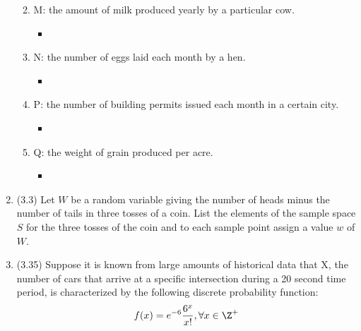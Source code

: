 \documentclass[basic, header]{nosvagor-notes}
\begin{document}
\begin{enumerate}[itemsep=7em]
\begin{enumerate}[label={}, leftmargin=0em]
\begin{itemize}
        \end{itemize}
      \item M: the amount of milk produced yearly by a particular cow.
        \begin{itemize}
          \item

        \end{itemize}
      \item N: the number of eggs laid each month by a hen.
        \begin{itemize}
          \item

        \end{itemize}
      \item P: the number of building permits issued each month in a certain city.
        \begin{itemize}
          \item

        \end{itemize}
      \item Q: the weight of grain produced per acre.
        \begin{itemize}
          \item

        \end{itemize}

    \end{enumerate}

  \newpage %

  \item (3.3) Let \(W\) be a random variable giving the number of heads minus the
    number of tails in three tosses of a coin. List the elements of the sample
    space \(S\) for the three tosses of the coin and to each sample point assign a
    value \(w\) of \(W\).

  \item (3.35) Suppose it is known from large amounts of historical data that
    X, the number of cars that arrive at a specific intersection during a
    20 second time period, is characterized by the following discrete
    probability function:
    \[%
      f(x) = e^{-6}\frac{6^x}{x!}, \forall x \in \Z^+
    \]%
    \begin{enumerate}


\end{enumerate}
\end{enumerate}
\end{document}
